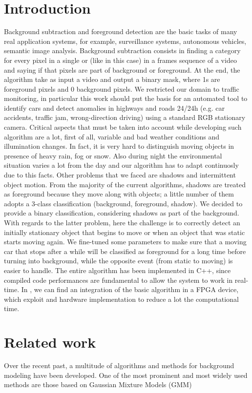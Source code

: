 \section*{Introduction}
Background subtraction and foreground detection are the basic tasks of many real application systems,
for example, surveillance systems, autonomous vehicles, semantic image analysis. Background subtraction
consists in finding a category for every pixel in a single or (like in this case) in a frames sequence
of a video and saying if that pixels are part of background or foreground. At the end, the algorithm take as input a video and output a binary mask, where 1s are foreground pixels and 0 background pixels.
We restricted our domain to traffic monitoring, in particular this work should put the basis for an automated
tool to identify cars and detect anomalies in highways and roads 24/24h (e.g. car accidents,
traffic jam, wrong-direction driving) using a standard RGB stationary camera.
Critical aspects that must be taken into account while developing such algorithm are a lot, first of all,
variable and bad weather conditions and illumination changes. In fact, it is very hard to distinguish
moving objects in presence of heavy rain, fog or snow. Also during night the environmental situation varies
a lot from the day and our algorithm has to adapt continuosly due to this facts. 
Other problems that we faced are shadows and intermittent object motion.
From the majority of the current algorithms, shadows are treated as foreground because they move along with
objects; a little number of them adopts a 3-class classification (background, foreground, shadow). We
decided to provide a binary classification, considering shadows as part of the background. With regards to
the latter problem, here the challenge is to correctly detect an initially stationary object that begins to
move or when an object that was static starts moving again. We fine-tuned some parameters to make sure
that a moving car that stops after a while will be classified as foreground for a long time before turning
into background, while the opposite event (from static to moving) is easier to handle.
The entire algorithm has been implemented in C++, since compiled code performances are fundamental to
allow the system to work in real-time. In \cite{pbas_and_scene_analysis_fpga}, we can find an integration of
the basic algorithm in a FPGA device, which exploit and hardware implementation to reduce a lot the
computational time.


\section*{Related work}
Over the recent past, a multitude of algorithms and methods for background modeling have been developed.
One of the most prominent and most widely used methods are those based on Gaussian Mixture Models (GMM)

